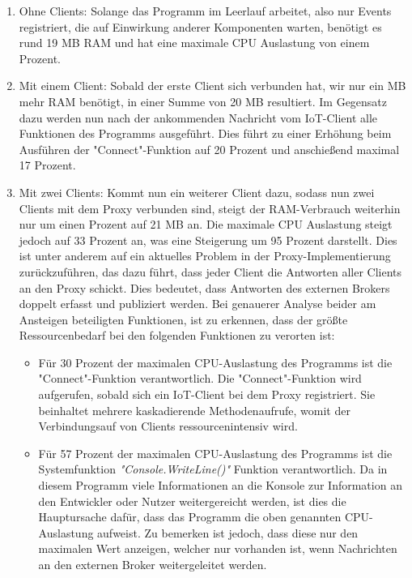     \begin{enumerate}
        \item Ohne Clients:
        Solange das Programm im Leerlauf arbeitet, also nur Events registriert, die auf Einwirkung anderer Komponenten warten, benötigt es rund 19 \ac{MB} \ac{RAM} und hat eine maximale \ac{CPU} Auslastung von einem Prozent.
        \item Mit einem Client:
        Sobald der erste Client sich verbunden hat, wir nur ein \ac{MB} mehr \ac{RAM} benötigt, in einer Summe von 20 \ac{MB} resultiert. Im Gegensatz dazu werden nun nach der ankommenden Nachricht vom \ac{IoT}-Client alle Funktionen des Programms ausgeführt. Dies führt zu einer Erhöhung beim Ausführen der "Connect"-Funktion auf 20 Prozent und anschießend maximal 17 Prozent.
        \item Mit zwei Clients:
        Kommt nun ein weiterer Client dazu, sodass nun zwei Clients mit dem Proxy verbunden sind, steigt der \ac{RAM}-Verbrauch weiterhin nur um einen Prozent auf 21 \ac{MB} an. Die maximale \ac{CPU} Auslastung steigt jedoch auf 33 Prozent an, was eine Steigerung um 95 Prozent darstellt. Dies ist unter anderem auf ein aktuelles Problem in der Proxy-Implementierung %
        zurückzuführen, das dazu führt, dass jeder Client die Antworten aller Clients an den Proxy schickt. Dies bedeutet, dass Antworten des externen Brokers doppelt erfasst und publiziert werden.
        Bei genauerer Analyse beider am Ansteigen beteiligten Funktionen, ist zu erkennen, dass der größte Ressourcenbedarf bei den folgenden Funktionen zu verorten ist:
        \begin{itemize}
            \item Für 30 Prozent der maximalen \ac{CPU}-Auslastung des Programms ist die "Connect"-Funktion verantwortlich. Die "Connect"-Funktion wird aufgerufen, sobald sich ein \ac{IoT}-Client bei dem Proxy registriert. Sie beinhaltet mehrere kaskadierende Methodenaufrufe, womit der Verbindungsauf von Clients ressourcenintensiv wird.  
            \item Für 57 Prozent der maximalen \ac{CPU}-Auslastung des Programms ist die Systemfunktion \emph{"Console.WriteLine()"} Funktion verantwortlich. Da in diesem Programm viele Informationen an die Konsole zur Information an den Entwickler oder Nutzer weitergereicht werden, ist dies die Hauptursache dafür, dass das Programm die oben genannten \ac{CPU}-Auslastung aufweist. Zu bemerken ist jedoch, dass diese nur den maximalen Wert anzeigen, welcher nur vorhanden ist, wenn Nachrichten an den externen Broker weitergeleitet werden.
        \end{itemize}
    \end{enumerate}
